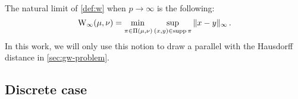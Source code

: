         \begin{remark}
            The natural limit of \cref{def:w} when $p\to\infty$ is the following:
            \begin{equation}
                \operatorname{W}_{\infty}(\mu,\nu)= \adjustlimits\min_{\pi \in \Pi(\mu,\nu)}\sup_{(x,y)\in\supp\pi} \|x-y\|_\infty\,.
                \label{eq:w-infty}
            \end{equation}
            In this work, we will only use this notion to draw a parallel with the Hausdorff distance in \cref{sec:gw-problem}.
        \end{remark}


    \subsection{Discrete case}
        \label{sec:disc-ot}

